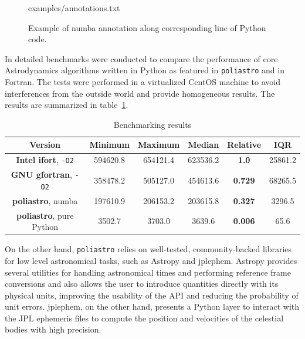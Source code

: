 \begin{figure}
\begin{lstinputlisting}[language=Python]{examples/annotations.txt}
\end{lstinputlisting}
\caption{Example of numba annotation along corresponding line of Python code.}
\label{fig:numba}
\end{figure}

In \cite{cano2016icatt} detailed benchmarks were conducted to compare the performance of core Astrodynamics algorithms written in Python as featured in \verb|poliastro| and in Fortran. The tests were performed in a virtualized CentOS machine to avoid interferences from the outside world and provide homogeneous results. The results are summarized in table~\ref{table:results}.

\begin{table}
    \centering
    \begin{tabular}{ c|c c c c c }
          \textbf{Version} & \textbf{Minimum} & \textbf{Maximum} & \textbf{Median} & \textbf{Relative} & \textbf{IQR} \\
    \hline
        \textbf{Intel ifort}, \verb|-O2| & 594620.8 & 654121.4 & 623536.2 & \textbf{1.0} & 25861.2 \\ 
        \textbf{GNU gfortran}, \verb|-O2| & 358478.2 & 505127.0 & 454613.6 & \textbf{0.729} & 68265.5 \\ 
        \textbf{poliastro}, numba & 197610.9 & 206153.2 & 203615.8 & \textbf{0.327} & 3296.5 \\ 
        \textbf{poliastro}, pure Python & 3502.7 & 3703.0 & 3639.6 & \textbf{0.006} & 65.6 \\ 
    \end{tabular}
    \caption{Benchmarking results}
    \label{table:results}
\end{table}

On the other hand, \verb|poliastro| relies on well-tested, community-backed libraries for low level astronomical tasks, such as Astropy\cite{robitaille2013astropy} and jplephem. Astropy provides several utilities for handling astronomical times and performing reference frame conversions and also allows the user to introduce quantities directly with its physical units, improving the usability of the API  and reducing the probability of unit errors. jplephem, on the other hand, presents a Python layer to interact with the JPL ephemeris files to compute the position and velocities of the celestial bodies with high precision.

